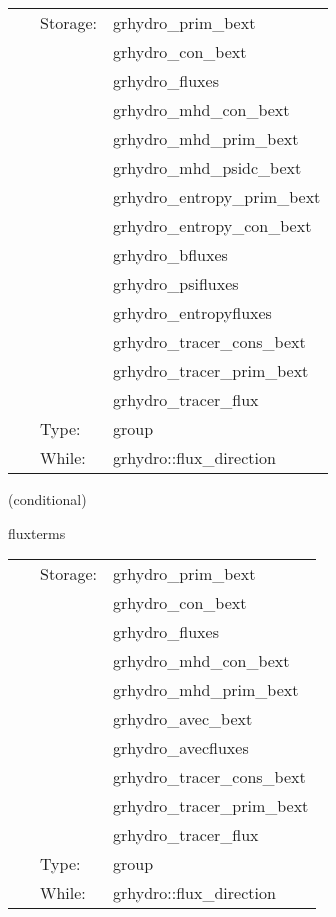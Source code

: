 \documentclass{article}
\begin{document}
 \begin{tabular*}{160mm}{cll} 
~ & Storage:  & grhydro\_prim\_bext \\ 
~& ~ &grhydro\_con\_bext\\ 
~& ~ &grhydro\_fluxes\\ 
~& ~ &grhydro\_mhd\_con\_bext\\ 
~& ~ &grhydro\_mhd\_prim\_bext\\ 
~& ~ &grhydro\_mhd\_psidc\_bext\\ 
~& ~ &grhydro\_entropy\_prim\_bext\\ 
~& ~ &grhydro\_entropy\_con\_bext\\ 
~& ~ &grhydro\_bfluxes\\ 
~& ~ &grhydro\_psifluxes\\ 
~& ~ &grhydro\_entropyfluxes\\ 
~& ~ &grhydro\_tracer\_cons\_bext\\ 
~& ~ &grhydro\_tracer\_prim\_bext\\ 
~& ~ &grhydro\_tracer\_flux\\ 
~ & Type:  & group \\ 
~ & While:  & grhydro::flux\_direction \\ 
\end{tabular*} 


\vspace{5mm}

   (conditional) 

\hspace{5mm} fluxterms 

\hspace{5mm}{\it calculation of intercell fluxes } 


\hspace{5mm}

 \begin{tabular*}{160mm}{cll} 
~ & Storage:  & grhydro\_prim\_bext \\ 
~& ~ &grhydro\_con\_bext\\ 
~& ~ &grhydro\_fluxes\\ 
~& ~ &grhydro\_mhd\_con\_bext\\ 
~& ~ &grhydro\_mhd\_prim\_bext\\ 
~& ~ &grhydro\_avec\_bext\\ 
~& ~ &grhydro\_avecfluxes\\ 
~& ~ &grhydro\_tracer\_cons\_bext\\ 
~& ~ &grhydro\_tracer\_prim\_bext\\ 
~& ~ &grhydro\_tracer\_flux\\ 
~ & Type:  & group \\ 
~ & While:  & grhydro::flux\_direction \\ 
\end{tabular*} 
\end{document}
